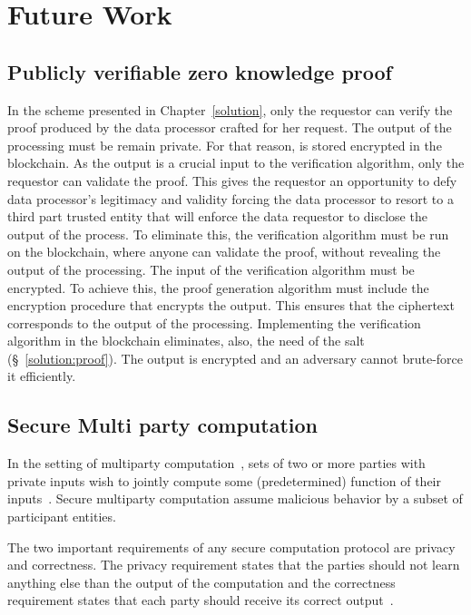 \chapter{Future Work}
\label{future_work}

\section{Publicly verifiable zero knowledge proof}
\label{future_work:zkp_ver}

In the scheme presented in Chapter~\ref{solution}, only the requestor can verify the proof produced by the data processor crafted for her request. The output of the processing must be remain private. For that reason, is stored encrypted in the blockchain. As the output is a crucial input to the verification algorithm, only the requestor can validate the proof. This gives the requestor an opportunity to defy data processor's legitimacy and validity forcing the data processor to resort to a third part trusted entity that will enforce the data requestor to disclose the output of the process. To eliminate this, the verification algorithm must be run on the blockchain, where anyone can validate the proof, without revealing the output of the processing. The input of the verification algorithm must be encrypted. To achieve this, the proof generation algorithm must include the encryption procedure that encrypts the output. This ensures that the ciphertext corresponds to the output of the processing. Implementing the verification algorithm in the blockchain eliminates, also, the need of the salt (§~\ref{solution:proof}). The output is encrypted and an adversary cannot brute-force it efficiently.

\section{Secure Multi party computation}
\label{future_work:mpc}

In the setting of multiparty computation~\cite{Ben-Or:1988:CTN:62212.62213}, sets of two or more parties with private inputs wish to jointly compute some (predetermined) function of their inputs~\cite{mpc}. Secure multiparty computation assume malicious behavior by a subset of participant entities.

The two important requirements of any secure computation protocol are privacy and correctness. The privacy requirement states that the parties should not learn anything else than the output of the computation and the correctness requirement states that each party should receive its correct output~\cite{mpc}.

